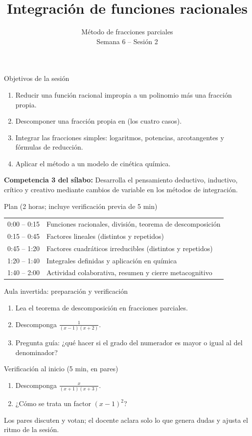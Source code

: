 \documentclass[10pt,aspectratio=169]{beamer}
\title[Fracciones parciales]{Integración de funciones racionales}
\subtitle{Método de fracciones parciales\\[2pt]\small Semana 6 -- Sesión 2}
\begin{document}
\begin{frame}
  \titlepage
\end{frame}

\begin{frame}{Objetivos de la sesión}
  \begin{enumerate}
    \item Reducir una función racional impropia a un polinomio más una fracción propia.
    \item Descomponer una fracción propia en  (los cuatro casos).
    \item Integrar las fracciones simples: logaritmos, potencias, arcotangentes y fórmulas de reducción.
    \item Aplicar el método a un modelo de cinética química.
  \end{enumerate}
  \vspace{1mm}
  {\small\textbf{Competencia 3 del sílabo:} Desarrolla el pensamiento deductivo, inductivo, crítico y creativo mediante cambios de variable en los métodos de integración.}
  \begin{block}{Plan (2 horas; incluye verificación previa de 5 min)}
    \begin{tabular}{ll}
      0:00 -- 0:15 & Funciones racionales, división, teorema de descomposición\\
      0:15 -- 0:45 & Factores lineales (distintos y repetidos)\\
      0:45 -- 1:20 & Factores cuadráticos irreducibles (distintos y repetidos)\\
      1:20 -- 1:40 & Integrales definidas y aplicación en química\\
      1:40 -- 2:00 & Actividad colaborativa, resumen y cierre metacognitivo
    \end{tabular}
  \end{block}
\end{frame}

\begin{frame}{Aula invertida: preparación y verificación}
  \small
  \begin{previa}
    \begin{enumerate}
      \item Lea el teorema de descomposición en fracciones parciales.
      \item Descomponga $\frac{1}{(x-1)(x+2)}$.
      \item Pregunta guía: ¿qué hacer si el grado del numerador es mayor o igual al del denominador?
    \end{enumerate}
  \end{previa}
  \begin{block}{Verificación al inicio (5 min, en pares)}
    \begin{enumerate}
      \item Descomponga $\frac{x}{(x+1)(x+3)}$.
      \item ¿Cómo se trata un factor $(x-1)^2$?
    \end{enumerate}
    Los pares discuten y votan; el docente aclara solo lo que genera dudas y ajusta el ritmo de la sesión.
  \end{block}
\end{frame}
\end{document}
